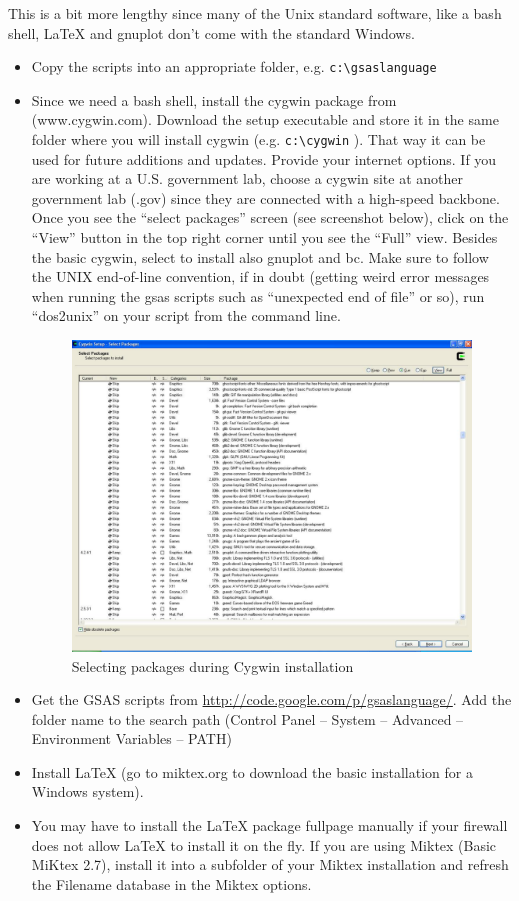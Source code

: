 This is a bit more lengthy since many of the Unix standard software, like a bash shell, \LaTeX{}  and gnuplot don't come with the standard Windows.
\begin{itemize}
\item Copy the scripts into an appropriate folder, e.g. \texttt{c:\textbackslash gsaslanguage} 
\item Since we need a bash shell, install the cygwin package from (www.cygwin.com).  Download the setup executable and store it in the same folder where you will install cygwin (e.g. \texttt{c:\textbackslash cygwin} ). That way it can be used for future additions and updates. Provide your internet options. If you are working at a U.S. government lab, choose a cygwin site at another government lab (.gov) since they are connected with a high-speed backbone. Once you see the ``select packages'' screen (see screenshot below), click on the ``View'' button in the top right corner until you see the ``Full'' view. Besides the basic cygwin, select to install also gnuplot and bc.  Make sure to follow the UNIX end-of-line convention, if in doubt (getting weird error messages when running the gsas scripts such as ``unexpected end of file'' or so), run ``dos2unix'' on your script from the command line.
\begin{figure}[h]
\centering
\includegraphics[width=12cm]{Screenshot1.pdf}
\caption{Selecting packages during Cygwin installation}
\label{fig:Screenshot1}
\end{figure}

\item Get the GSAS scripts from \url{http://code.google.com/p/gsaslanguage/}. Add the folder name to the search path (Control Panel -- System -- Advanced
-- Environment Variables -- PATH)
\item Install \LaTeX{}  (go to miktex.org to download the basic installation for a Windows system).
\item You may have to install the \LaTeX{}  package fullpage manually if your firewall does not allow \LaTeX{}  to install it on the fly. If you are using Miktex (Basic MiKtex 2.7), install it into a subfolder of your Miktex installation and refresh the Filename database in the Miktex options.
\end{itemize}

